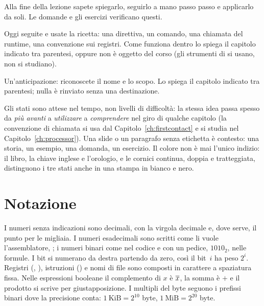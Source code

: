 \begin{description}[style=nextline,leftmargin=1.5em]
\item[\masterychip{now}{DA COMPRENDERE OGGI}] Alla fine della lezione sapete spiegarlo,
  seguirlo a mano passo passo e applicarlo da soli. Le domande e gli esercizi verificano questi.
\item[\masterychip{use}{DA UTILIZZARE OGGI}] Oggi seguite e usate la ricetta: una direttiva, un
  comando, una chiamata del runtime, una convenzione sui registri. Come funziona dentro lo
  spiega il capitolo indicato tra parentesi, oppure non è oggetto del corso (gli strumenti di
  \prg si usano, non si studiano).
\item[\masterychip{later}{DA COMPRENDERE PIÙ AVANTI}] Un'anticipazione: riconoscete il nome e lo
  scopo. Lo spiega il capitolo indicato tra parentesi; nulla è rinviato senza una destinazione.
\end{description}

Gli stati sono attese nel tempo, non livelli di difficoltà: la stessa idea passa spesso da
\emph{più avanti} a \emph{utilizzare} a \emph{comprendere} nel giro di qualche capitolo (la
convenzione di chiamata si usa dal Capitolo~\ref{ch:firstcontact} e si studia nel
Capitolo~\ref{ch:processor}). Una slide o un paragrafo senza etichetta è contesto: una storia,
un esempio, una domanda, un esercizio. Il colore non è mai l'unico indizio: il libro, la chiave
inglese e l'orologio, e le cornici continua, doppia e tratteggiata, distinguono i tre stati
anche in una stampa in bianco e nero.

\section*{Notazione}

I numeri senza indicazioni sono decimali, con la virgola decimale e, dove
serve, il punto per le migliaia. I numeri esadecimali sono scritti come li
vuole l'assemblatore, ; i numeri binari come  nel codice
e con un pedice, $1010_2$, nelle formule. I bit si numerano da destra partendo
da zero, così il bit~$i$ ha peso $2^{i}$. Registri (, ),
istruzioni () e nomi di file sono composti in carattere a spaziatura
fissa. Nelle espressioni booleane il complemento di $x$ è $\overline{x}$, la somma
è $+$ e il prodotto si scrive per giustapposizione. I multipli del byte seguono
i prefissi binari dove la precisione conta:
$1~\mathrm{KiB}=2^{10}$ byte, $1~\mathrm{MiB}=2^{20}$ byte.

